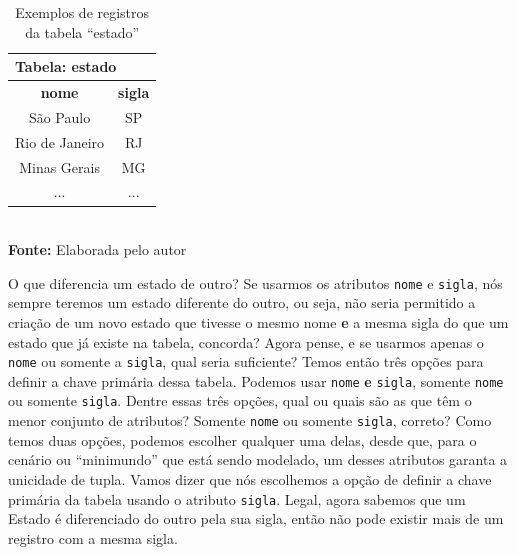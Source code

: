 \FloatBarrier
\begin{table}[ht]
    \centering
    \caption{Exemplos de registros da tabela ``estado''}
	\begin{tabular}{cc}
	    \hline
	    \multicolumn{2}{l}{\textbf{Tabela: estado}} \\ \hline
	    \textbf{nome}  &       \textbf{sigla}       \\ \hline
	      São Paulo    &             SP             \\ \hline
	    Rio de Janeiro &             RJ             \\ \hline
	     Minas Gerais  &             MG             \\ \hline
	         ...       &            ...             \\ \hline
	\end{tabular}
    \\ \vspace{0.2cm}
    \textbf{Fonte:} Elaborada pelo autor
    \label{tab:exemplosEstados}
\end{table}
\FloatBarrier

O que diferencia um estado de outro? Se usarmos os atributos \texttt{nome} e \texttt{sigla}, nós sempre teremos um estado diferente do outro, ou seja, não seria permitido a criação de um novo estado que tivesse o mesmo nome \textbf{e} a mesma sigla do que um estado que já existe na tabela, concorda? Agora pense, e se usarmos apenas o \texttt{nome} ou somente a \texttt{sigla}, qual seria suficiente? Temos então três opções para definir a chave primária dessa tabela. Podemos usar \texttt{nome} \textbf{e} \texttt{sigla}, somente \texttt{nome} ou somente \texttt{sigla}. Dentre essas três opções, qual ou quais são as que têm o menor conjunto de atributos? Somente \texttt{nome} ou somente \texttt{sigla}, correto? Como temos duas opções, podemos escolher qualquer uma delas, desde que, para o cenário ou ``minimundo'' que está sendo modelado, um desses atributos garanta a unicidade de tupla. Vamos dizer que nós escolhemos a opção de definir a chave primária da tabela usando o atributo \texttt{sigla}. Legal, agora sabemos que um Estado é diferenciado do outro pela sua sigla, então não pode existir mais de um registro com a mesma sigla.

